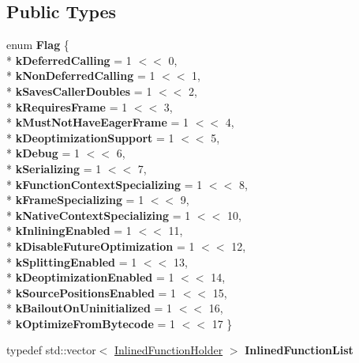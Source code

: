 \subsection*{Public Types}
\begin{DoxyCompactItemize}
\item 
enum {\bfseries Flag} \{ \\*
{\bfseries k\+Deferred\+Calling} = 1 $<$$<$ 0, 
\\*
{\bfseries k\+Non\+Deferred\+Calling} = 1 $<$$<$ 1, 
\\*
{\bfseries k\+Saves\+Caller\+Doubles} = 1 $<$$<$ 2, 
\\*
{\bfseries k\+Requires\+Frame} = 1 $<$$<$ 3, 
\\*
{\bfseries k\+Must\+Not\+Have\+Eager\+Frame} = 1 $<$$<$ 4, 
\\*
{\bfseries k\+Deoptimization\+Support} = 1 $<$$<$ 5, 
\\*
{\bfseries k\+Debug} = 1 $<$$<$ 6, 
\\*
{\bfseries k\+Serializing} = 1 $<$$<$ 7, 
\\*
{\bfseries k\+Function\+Context\+Specializing} = 1 $<$$<$ 8, 
\\*
{\bfseries k\+Frame\+Specializing} = 1 $<$$<$ 9, 
\\*
{\bfseries k\+Native\+Context\+Specializing} = 1 $<$$<$ 10, 
\\*
{\bfseries k\+Inlining\+Enabled} = 1 $<$$<$ 11, 
\\*
{\bfseries k\+Disable\+Future\+Optimization} = 1 $<$$<$ 12, 
\\*
{\bfseries k\+Splitting\+Enabled} = 1 $<$$<$ 13, 
\\*
{\bfseries k\+Deoptimization\+Enabled} = 1 $<$$<$ 14, 
\\*
{\bfseries k\+Source\+Positions\+Enabled} = 1 $<$$<$ 15, 
\\*
{\bfseries k\+Bailout\+On\+Uninitialized} = 1 $<$$<$ 16, 
\\*
{\bfseries k\+Optimize\+From\+Bytecode} = 1 $<$$<$ 17
 \}\hypertarget{classv8_1_1internal_1_1_compilation_info_af80eaf7a18408470c72918431de76dac}{}\label{classv8_1_1internal_1_1_compilation_info_af80eaf7a18408470c72918431de76dac}

\item 
typedef std\+::vector$<$ \hyperlink{structv8_1_1internal_1_1_compilation_info_1_1_inlined_function_holder}{Inlined\+Function\+Holder} $>$ {\bfseries Inlined\+Function\+List}\hypertarget{classv8_1_1internal_1_1_compilation_info_aed0b7a2782bcb92132aa3b0787df898d}{}\label{classv8_1_1internal_1_1_compilation_info_aed0b7a2782bcb92132aa3b0787df898d}

\end{DoxyCompactItemize}
